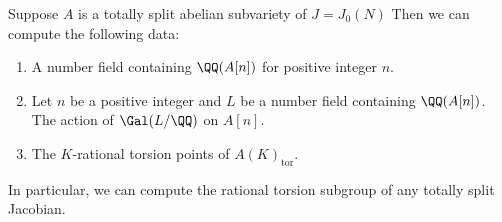 \documentclass{article}
\renewcommand{\tor}{\mathrm{tor}}
\begin{document}
\begin{proposition}
    Suppose $A$ is a totally split abelian subvariety of $J=J_0(N)$ Then we can
    compute the following data:
    \begin{enumerate}
        \item
            A number field containing $\QQ(A[n])$ for positive integer $n$.
        \item
            Let $n$ be a positive integer and $L$ be a number field containing
            $\QQ(A[n])$. The action of $\Gal(L/\QQ)$ on $A[n]$.
        \item 
            The $K$-rational torsion points of $A(K)_\tor$.
    \end{enumerate}
    In particular, we can compute the rational torsion subgroup of any totally
    split Jacobian.
\end{proposition}
\end{document}
